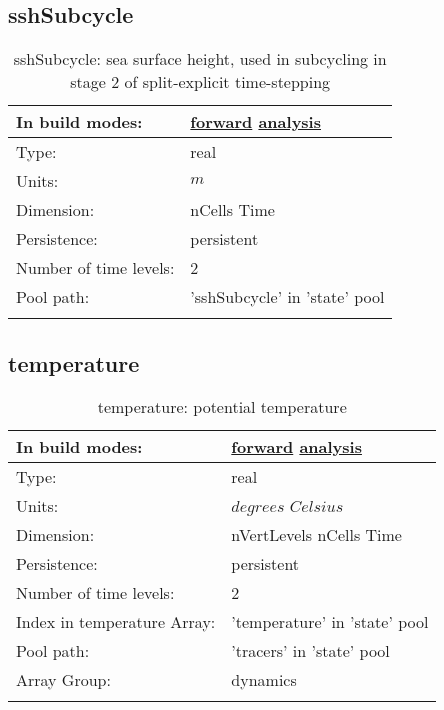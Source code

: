 \subsection[sshSubcycle]{sshSubcycle}
\label{subsec:var_sec_state_sshSubcycle}
\begin{center}
\begin{longtable}{| p{2.0in} | p{4.0in} |}
        \hline 
        In build modes: & \hyperref[subsec:forward_var_tab_state]{forward} \hyperref[subsec:analysis_var_tab_state]{analysis} \\
        \hline 
        Type: & real \\
        \hline 
        Units: & $m$ \\
        \hline 
        Dimension: & nCells Time \\
        \hline 
        Persistence: & persistent \\
        \hline 
        Number of time levels: & 2 \\
        \hline 
            Pool path: & 'sshSubcycle' in 'state' pool
 \\
		 \hline 
    \caption{sshSubcycle: sea surface height, used in subcycling in stage 2 of split-explicit time-stepping}
\end{longtable}
\end{center}
\subsection[temperature]{temperature}
\label{subsec:var_sec_state_temperature}
\begin{center}
\begin{longtable}{| p{2.0in} | p{4.0in} |}
        \hline 
        In build modes: & \hyperref[subsec:forward_var_tab_state]{forward} \hyperref[subsec:analysis_var_tab_state]{analysis} \\
        \hline 
        Type: & real \\
        \hline 
        Units: & $degrees$ $Celsius$ \\
        \hline 
        Dimension: & nVertLevels nCells Time \\
        \hline 
        Persistence: & persistent \\
        \hline 
        Number of time levels: & 2 \\
        \hline 
		 Index in temperature Array: & 'temperature' in 'state' pool \\
		 \hline 
            Pool path: & 'tracers' in 'state' pool
 \\
		 \hline 
		 Array Group: & dynamics \\
		 \hline 
    \caption{temperature: potential temperature}
\end{longtable}
\end{center}
